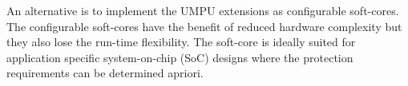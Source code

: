 An alternative is to implement the UMPU extensions as configurable
soft-cores.
%
The configurable soft-cores have the benefit of reduced hardware
complexity but they also lose the run-time flexibility.
%
The soft-core is ideally suited for application specific
system-on-chip (SoC) designs where the protection requirements can be
determined apriori.




















